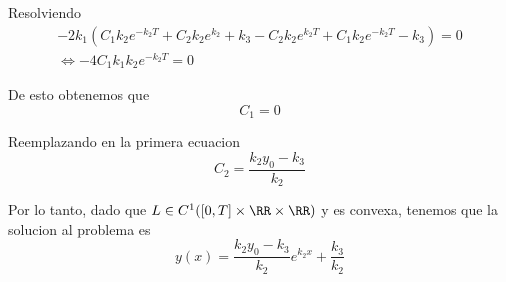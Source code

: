 \documentclass[a4paper,oneside,10.5pt]{USMArt}
\begin{document}
\begin{sol}
\begin{enumerate}
        Resolviendo
        \begin{gather*}
          -2k_{1}(C_{1}k_{2}e^{-k_{2}T} + C_{2}k_{2}e^{k_{2}} + k_{3} - C_{2}k_{2}e^{k_{2}T} + C_{1}k_{2}e^{-k_{2}T} - k_{3}) = 0\\
          \iff -4C_{1}k_{1}k_{2}e^{-k_{2}T} = 0
        \end{gather*}

        De esto obtenemos que
        \begin{equation*}
          C_{1} = 0
        \end{equation*}

        Reemplazando en la primera ecuacion
        \begin{equation*}
          C_{2} = \frac{k_{2}y_{0} - k_{3}}{k_{2}}
        \end{equation*}

        Por lo tanto, dado que $L \in C^{1}([0, T] \times \RR \times \RR)$ y es convexa, tenemos que la solucion
        al problema es
        \begin{equation*}
          y(x) = \frac{k_{2}y_{0} - k_{3}}{k_{2}}e^{k_{2}x} + \frac{k_{3}}{k_{2}}
        \end{equation*}

\end{enumerate}
\end{sol}
\end{document}
